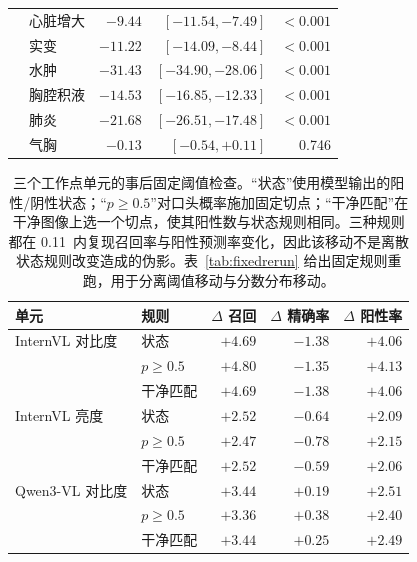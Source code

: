 \begin{table}[H]
\begin{tabular}{llrrr}
 & 心脏增大 & $-9.44$ & $[-11.54,-7.49]$ & $<0.001$ \\
 & 实变 & $-11.22$ & $[-14.09,-8.44]$ & $<0.001$ \\
 & 水肿 & $-31.43$ & $[-34.90,-28.06]$ & $<0.001$ \\
 & 胸腔积液 & $-14.53$ & $[-16.85,-12.33]$ & $<0.001$ \\
 & 肺炎 & $-21.68$ & $[-26.51,-17.48]$ & $<0.001$ \\
 & 气胸 & $-0.13$ & $[-0.54,+0.11]$ & 0.746 \\
\bottomrule
\end{tabular}
\end{table}

\begin{table}[H]
\centering
\small
\caption{三个工作点单元的事后固定阈值检查。``状态''使用模型输出的阳性/阴性状态；``$p\ge0.5$''对口头概率施加固定切点；``干净匹配''在干净图像上选一个切点，使其阳性数与状态规则相同。三种规则都在 0.11\,\pp{} 内复现召回率与阳性预测率变化，因此该移动不是离散状态规则改变造成的伪影。表~\ref{tab:fixedrerun} 给出固定规则重跑，用于分离阈值移动与分数分布移动。}
\label{tab:fixedthr}
\begin{tabular}{llrrr}
\toprule
单元 & 规则 & $\Delta$ 召回 & $\Delta$ 精确率 & $\Delta$ 阳性率 \\
\midrule
InternVL 对比度 & 状态 & $+4.69$ & $-1.38$ & $+4.06$ \\
 & $p\ge0.5$ & $+4.80$ & $-1.35$ & $+4.13$ \\
 & 干净匹配 & $+4.69$ & $-1.38$ & $+4.06$ \\
\midrule
InternVL 亮度 & 状态 & $+2.52$ & $-0.64$ & $+2.09$ \\
 & $p\ge0.5$ & $+2.47$ & $-0.78$ & $+2.15$ \\
 & 干净匹配 & $+2.52$ & $-0.59$ & $+2.06$ \\
\midrule
Qwen3-VL 对比度 & 状态 & $+3.44$ & $+0.19$ & $+2.51$ \\
 & $p\ge0.5$ & $+3.36$ & $+0.38$ & $+2.40$ \\
 & 干净匹配 & $+3.44$ & $+0.25$ & $+2.49$ \\
\bottomrule
\end{tabular}
\end{table}

